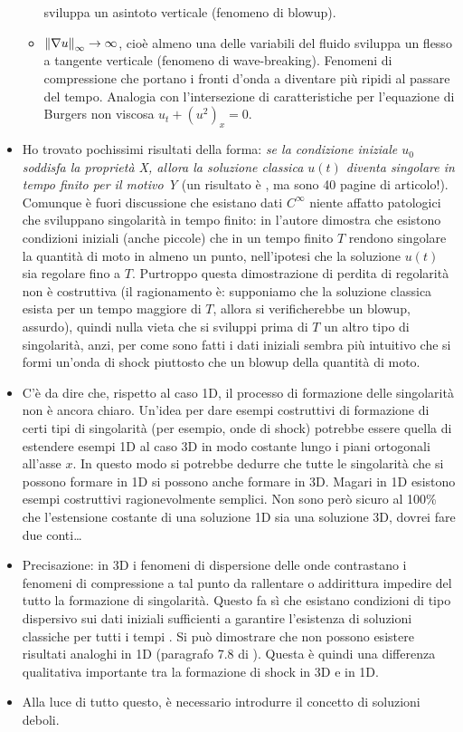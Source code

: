 \begin{itemize}
\begin{itemize}
		sviluppa un asintoto verticale (fenomeno di blowup).
	\item $\left\lVert\nabla u\right\rVert_\infty \to \infty$, cioè almeno una delle variabili
		del fluido sviluppa un flesso a tangente verticale (fenomeno di wave-breaking).
		Fenomeni di compressione che portano i fronti d'onda
		a diventare più ripidi al passare del tempo.
		Analogia con l'intersezione di caratteristiche per
		l'equazione di Burgers non viscosa $u_t + (u^2)_x = 0$.
	\end{itemize}
\item Ho trovato pochissimi risultati della forma: \emph{se la condizione iniziale
	$u_0$ soddisfa la proprietà X, allora la soluzione classica $u(t)$
	diventa singolare in tempo finito per il motivo Y}
	(un risultato è \cite{yin}, ma sono 40 pagine di articolo!).
	Comunque è fuori discussione che esistano dati $C^\infty$
	niente affatto patologici che sviluppano singolarità in tempo finito:
	in \cite{sideris85} l'autore dimostra che esistono condizioni iniziali (anche piccole)
	che in un tempo finito $T$ rendono singolare la quantità di moto in almeno un punto,
	nell'ipotesi che la soluzione $u(t)$ sia regolare fino a $T$.
	Purtroppo questa dimostrazione di perdita di regolarità
	non è costruttiva (il ragionamento è: supponiamo che la soluzione
	classica esista per un tempo maggiore di $T$,
	allora si verificherebbe un blowup, assurdo),
	quindi nulla vieta che si sviluppi prima di $T$ un altro tipo di singolarità,
	anzi, per come sono fatti i dati iniziali sembra più intuitivo
	che si formi un'onda di shock piuttosto che un blowup della quantità di moto.
	
\item C'è da dire che, rispetto al caso 1D, il processo di formazione delle singolarità
	non è ancora chiaro. Un'idea per dare esempi costruttivi di formazione
	di certi tipi di singolarità (per esempio, onde di shock)
	potrebbe essere quella di estendere esempi 1D al caso 3D in modo
	costante lungo i piani ortogonali all'asse $x$.
	In questo modo si potrebbe dedurre che tutte le singolarità che si possono
	formare in 1D si possono anche formare in 3D.
	Magari in 1D esistono esempi costruttivi ragionevolmente semplici.
	Non sono però sicuro al 100\%
	che l'estensione costante di una soluzione 1D sia una soluzione 3D,
	dovrei fare due conti\dots

\item Precisazione: in 3D i fenomeni di dispersione delle onde contrastano
	i fenomeni di compressione a tal punto da rallentare o addirittura
	impedire del tutto la formazione di singolarità.
	Questo fa sì che esistano condizioni di tipo dispersivo sui dati iniziali
	sufficienti a garantire l'esistenza di soluzioni classiche per tutti i tempi
	\cite{grassin}.
	Si può dimostrare che non possono esistere risultati analoghi in 1D
	(paragrafo 7.8 di \cite{dafermos}).
	Questa è quindi una differenza qualitativa importante tra la formazione
	di shock in 3D e in 1D.
	
\item Alla luce di tutto questo, è necessario introdurre il concetto di soluzioni deboli.
\end{itemize}

